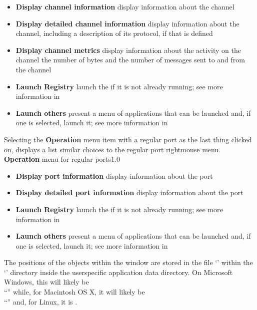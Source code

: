\begin{itemize}
\item\textbf{Display channel information} display information about the channel
\item\exSp\textbf{Display detailed channel information} display information about the
channel, including a description of its protocol, if that is defined
\item\exSp\textbf{Display channel metrics} display information about the activity on the
channel \longDash{} the number of bytes and the number of messages sent to and from the
channel
\item\exSp\textbf{Launch Registry} launch the \emph{\RS} if it is not already running; see
more information in\\
\item\exSp\textbf{Launch others \textellipsis} present a menu of applications that can be
launched and, if one is selected, launch it; see more information in
\end{itemize}
\condPage{}
Selecting the \textbf{Operation} menu item with a regular port as the last thing clicked on,
displays a list similar choices to the regular port right\longDash{}mouse menu.\\
%
{\textbf{Operation} menu for regular ports}{1.0}
\begin{itemize}
\item\textbf{Display port information} display information about the port
\item\exSp\textbf{Display detailed port information} display information about the port
\item\exSp\textbf{Launch Registry} launch the \emph{\RS} if it is not already running; see
more information in\\
\item\exSp\textbf{Launch others \textellipsis} present a menu of applications that can be
launched and, if one is selected, launch it; see more information in
\end{itemize}
\condPage{}
The positions of the objects within the window are stored in the file
`' within the `' directory inside the
user\longDash{}specific application data directory.
On Microsoft Windows, this will likely be\\
``'' while, for Macintosh OS X, it will likely be\\
``'' and, for Linux, it is \TBD.\\
\primaryEnd{}
